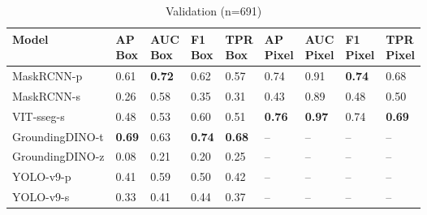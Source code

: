 \begin{table}[t]
    \begin{subtable}[b]{\textwidth} %
    \caption{Validation (n=691)}
    \centering
        \begin{tabular}{lllllllll}
        \toprule
         Model           & \makecell{AP\\Box}   & \makecell{AUC\\Box}   & \makecell{F1\\Box}   & \makecell{TPR\\Box}   & \makecell{AP\\Pixel}   & \makecell{AUC\\Pixel}   & \makecell{F1\\Pixel}   & \makecell{TPR\\Pixel}   \\
        \midrule
         MaskRCNN-p      & 0.61                 & \textbf{0.72}         & 0.62                 & 0.57                  & 0.74                   & 0.91                    & \textbf{0.74}          & 0.68                    \\
         MaskRCNN-s      & 0.26                 & 0.58                  & 0.35                 & 0.31                  & 0.43                   & 0.89                    & 0.48                   & 0.50                    \\
         VIT-sseg-s      & 0.48                 & 0.53                  & 0.60                 & 0.51                  & \textbf{0.76}          & \textbf{0.97}           & 0.74                   & \textbf{0.69}           \\
         GroundingDINO-t & \textbf{0.69}        & 0.63                  & \textbf{0.74}        & \textbf{0.68}         & --                     & --                      & --                     & --                      \\
         GroundingDINO-z & 0.08                 & 0.21                  & 0.20                 & 0.25                  & --                     & --                      & --                     & --                      \\
         YOLO-v9-p       & 0.41                 & 0.59                  & 0.50                 & 0.42                  & --                     & --                      & --                     & --                      \\
         YOLO-v9-s       & 0.33                 & 0.41                  & 0.44                 & 0.37                  & --                     & --                      & --                     & --                      \\
        \bottomrule
        \end{tabular}
    \end{subtable}


\end{table}
